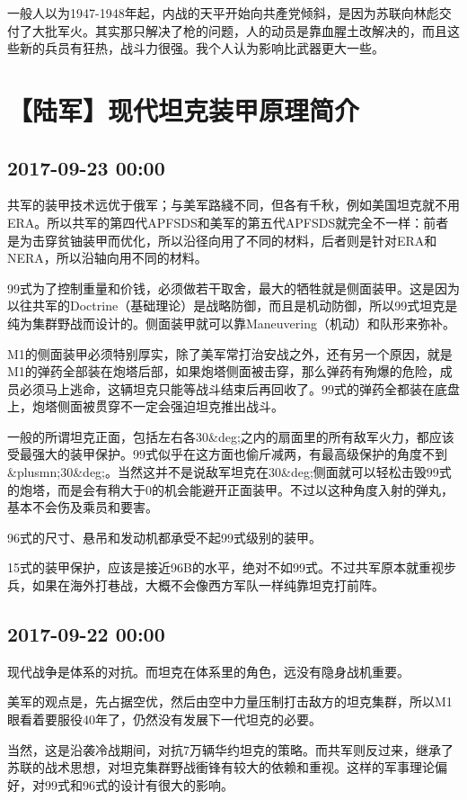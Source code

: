 \documentclass[twocolumn]{ctexart}
\begin{document}
一般人以为1947-1948年起，内战的天平开始向共產党倾斜，是因为苏联向林彪交付了大批军火。其实那只解决了枪的问题，人的动员是靠血腥土改解决的，而且这些新的兵员有狂热，战斗力很强。我个人认为影响比武器更大一些。\section*{【陆军】现代坦克装甲原理简介}
\subsection*{2017-09-23 00:00}
共军的装甲技术远优于俄军；与美军路綫不同，但各有千秋，例如美国坦克就不用ERA。所以共军的第四代APFSDS和美军的第五代APFSDS就完全不一样：前者是为击穿贫铀装甲而优化，所以沿径向用了不同的材料，后者则是针对ERA和NERA，所以沿轴向用不同的材料。

99式为了控制重量和价钱，必须做若干取舍，最大的牺牲就是侧面装甲。这是因为以往共军的Doctrine（基础理论）是战略防御，而且是机动防御，所以99式坦克是纯为集群野战而设计的。侧面装甲就可以靠Maneuvering（机动）和队形来弥补。

M1的侧面装甲必须特别厚实，除了美军常打治安战之外，还有另一个原因，就是M1的弹药全部装在炮塔后部，如果炮塔侧面被击穿，那么弹药有殉爆的危险，成员必须马上逃命，这辆坦克只能等战斗结束后再回收了。99式的弹药全都装在底盘上，炮塔侧面被贯穿不一定会强迫坦克推出战斗。

一般的所谓坦克正面，包括左右各30\&deg;之内的扇面里的所有敌军火力，都应该受最强大的装甲保护。99式似乎在这方面也偷斤减两，有最高级保护的角度不到\&plusmn;30\&deg;。当然这并不是说敌军坦克在30\&deg;侧面就可以轻松击毁99式的炮塔，而是会有稍大于0的机会能避开正面装甲。不过以这种角度入射的弹丸，基本不会伤及乘员和要害。

96式的尺寸、悬吊和发动机都承受不起99式级别的装甲。

15式的装甲保护，应该是接近96B的水平，绝对不如99式。不过共军原本就重视步兵，如果在海外打巷战，大概不会像西方军队一样纯靠坦克打前阵。\subsection*{2017-09-22 00:00}
现代战争是体系的对抗。而坦克在体系里的角色，远没有隐身战机重要。

美军的观点是，先占据空优，然后由空中力量压制打击敌方的坦克集群，所以M1眼看着要服役40年了，仍然没有发展下一代坦克的必要。

当然，这是沿袭冷战期间，对抗7万辆华约坦克的策略。而共军则反过来，继承了苏联的战术思想，对坦克集群野战衝锋有较大的依赖和重视。这样的军事理论偏好，对99式和96式的设计有很大的影响。
\end{document}
